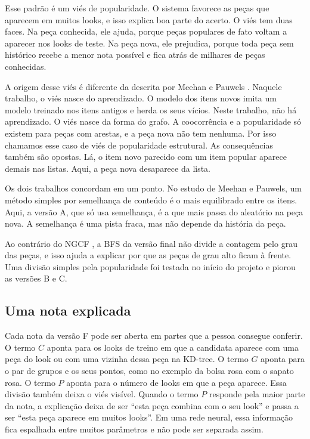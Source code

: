 \documentclass[conference]{IEEEtran}
\begin{document}
Esse padrão é um viés de popularidade. O sistema favorece as peças que aparecem em muitos looks, e isso explica boa parte do acerto. O viés tem duas faces. Na peça conhecida, ele ajuda, porque peças populares de fato voltam a aparecer nos looks de teste. Na peça nova, ele prejudica, porque toda peça sem histórico recebe a menor nota possível e fica atrás de milhares de peças conhecidas.

A origem desse viés é diferente da descrita por Meehan e Pauwels \cite{meehan2025}. Naquele trabalho, o viés nasce do aprendizado. O modelo dos itens novos imita um modelo treinado nos itens antigos e herda os seus vícios. Neste trabalho, não há aprendizado. O viés nasce da forma do grafo. A coocorrência e a popularidade só existem para peças com arestas, e a peça nova não tem nenhuma. Por isso chamamos esse caso de viés de popularidade estrutural. As consequências também são opostas. Lá, o item novo parecido com um item popular aparece demais nas listas. Aqui, a peça nova desaparece da lista.

Os dois trabalhos concordam em um ponto. No estudo de Meehan e Pauwels, um método simples por semelhança de conteúdo é o mais equilibrado entre os itens. Aqui, a versão A, que só usa semelhança, é a que mais passa do aleatório na peça nova. A semelhança é uma pista fraca, mas não depende da história da peça.

Ao contrário do NGCF \cite{wang2019}, a BFS da versão final não divide a contagem pelo grau das peças, e isso ajuda a explicar por que as peças de grau alto ficam à frente. Uma divisão simples pela popularidade foi testada no início do projeto e piorou as versões B e C.

\subsection{Uma nota explicada}

Cada nota da versão F pode ser aberta em partes que a pessoa consegue conferir. O termo $C$ aponta para os looks de treino em que a candidata aparece com uma peça do look ou com uma vizinha dessa peça na KD-tree. O termo $G$ aponta para o par de grupos e os seus pontos, como no exemplo da bolsa rosa com o sapato rosa. O termo $P$ aponta para o número de looks em que a peça aparece. Essa divisão também deixa o viés visível. Quando o termo $P$ responde pela maior parte da nota, a explicação deixa de ser ``esta peça combina com o seu look'' e passa a ser ``esta peça aparece em muitos looks''. Em uma rede neural, essa informação fica espalhada entre muitos parâmetros e não pode ser separada assim.
\end{document}
